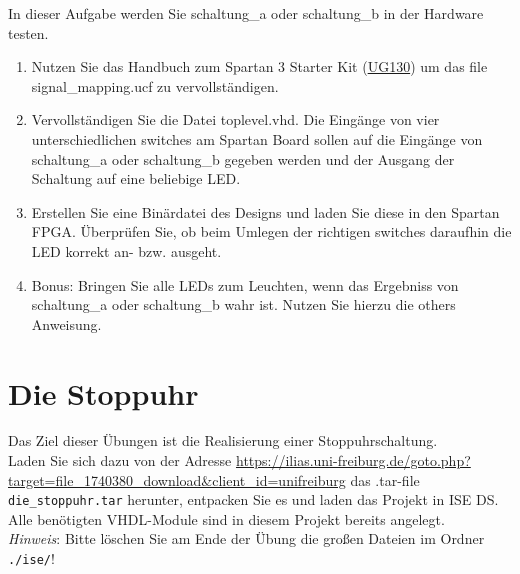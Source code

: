 \documentclass[12pt]{article}
\begin{document}
In dieser Aufgabe werden Sie schaltung\_a oder schaltung\_b in der Hardware testen.


\begin{enumerate}[label=\alph*.)]


\item Nutzen Sie das Handbuch zum Spartan 3 Starter Kit (\href{https://www.xilinx.com/support/documentation/boards_and_kits/ug130.pdf}{UG130}) um das file signal\_mapping.ucf
zu vervollständigen.


\item Vervollständigen Sie die Datei toplevel.vhd. Die Eingänge von vier unterschiedlichen switches
am Spartan Board sollen auf die Eingänge von schaltung\_a oder schaltung\_b gegeben werden
und der Ausgang der Schaltung auf eine beliebige LED.


\item Erstellen Sie eine Binärdatei des Designs und laden Sie diese in den Spartan FPGA.
Überprüfen Sie, ob beim Umlegen der richtigen switches daraufhin die LED korrekt an- bzw.
ausgeht.


\item Bonus: Bringen Sie alle LEDs zum Leuchten, wenn das Ergebniss von schaltung\_a oder schaltung\_b wahr ist. Nutzen Sie hierzu die others Anweisung.


\end{enumerate}





\part*{Die Stoppuhr}


Das Ziel dieser Übungen ist die Realisierung einer Stoppuhrschaltung.\\

Laden Sie sich dazu von der Adresse \url{https://ilias.uni-freiburg.de/goto.php?target=file_1740380_download&client_id=unifreiburg}
das .tar-file \texttt{die\_stoppuhr.tar} herunter, entpacken Sie es und laden das Projekt in ISE DS. Alle benötigten VHDL-Module sind in diesem Projekt bereits angelegt.\\

\textit{Hinweis}: Bitte löschen Sie am Ende der Übung die großen Dateien im Ordner \texttt{./ise/}!
\end{document}
